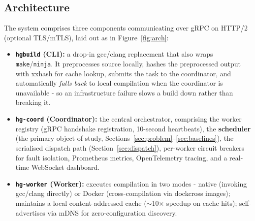 \documentclass[final,5p,times,twocolumn]{elsarticle}
\begin{document}
\subsection{Architecture}

The system comprises three components communicating over gRPC on HTTP/2 (optional TLS/mTLS), laid out as in Figure~\ref{fig:arch}:

\begin{itemize}
\item \textbf{\texttt{hgbuild} (CLI):} a drop-in gcc/clang replacement that also wraps \texttt{make}/\texttt{ninja}. It preprocesses source locally, hashes the preprocessed output with xxhash for cache lookup, submits the task to the coordinator, and automatically \emph{falls back} to local compilation when the coordinator is unavailable - so an infrastructure failure slows a build down rather than breaking it.
\item \textbf{\texttt{hg-coord} (Coordinator):} the central orchestrator, comprising the worker registry (gRPC handshake registration, 10-second heartbeats), the \textbf{scheduler} (the primary object of study, Sections~\ref{sec:problem}--\ref{sec:baselines}), the serialised dispatch path (Section~\ref{sec:dispatch}), per-worker circuit breakers for fault isolation, Prometheus metrics, OpenTelemetry tracing, and a real-time WebSocket dashboard.
\item \textbf{\texttt{hg-worker} (Worker):} executes compilation in two modes - native (invoking gcc/clang directly) or Docker (cross-compilation via dockcross images); maintains a local content-addressed cache ($\sim$10$\times$ speedup on cache hits); self-advertises via mDNS for zero-configuration discovery.
\end{itemize}
\end{document}
